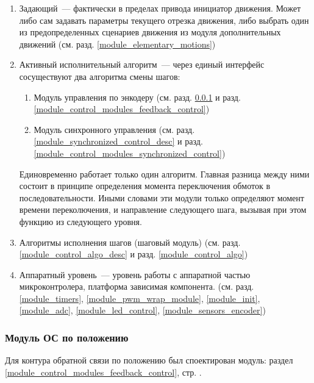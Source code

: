 \begin{enumerate}
    \item Задающий~--- фактически в пределах привода инициатор движения. Может
        либо сам задавать параметры текущего отрезка движения, либо выбрать один
        из предопределенных сценариев движения из модуля дополнительных
        движений (см. разд. \ref{module_elementary_motions})

    \item Активный исполнительный алгоритм~--- через единый интерфейс
        сосуществуют два алгоритма смены шагов:
        \begin{enumerate}
            \item Модуль управления по энкодеру (см. разд.
                \ref{module_feedback_control_desc} и разд.
                \ref{module_control_modules_feedback_control})
            \item Модуль синхронного управления (см. разд.
                \ref{module_synchronized_control_desc} и разд.
                \ref{module_control_modules_synchronized_control})
        \end{enumerate}
        Единовременно работает только один алгоритм. Главная разница между ними
        состоит в принципе определения момента переключения обмоток в
        последовательности. Иными словами эти модули только определяют момент
        времени переколючения, и направление следующего шага, вызывая при этом
        функцию из следующего уровня.
    \item Алгоритмы исполнения шагов (шаговый модуль) (см. разд.
        \ref{module_control_algo_desc} и разд.
        \ref{module_control_algo})
    \item Аппаратный уровень~--- уровень работы с аппаратной частью
        микроконтролера, платформа зависимая компонента. (см. разд.
            \ref{module_timers},
            \ref{module_pwm_wrap_module},
            \ref{module_init},
            \ref{module_adc},
            \ref{module_led_control},
            \ref{module_sensors_encoder})
\end{enumerate}

\subsubsection{Модуль ОС по положению}
\label{module_feedback_control_desc}
Для контура обратной связи по положению был споектирован модуль:
раздел \ref{module_control_modules_feedback_control},
стр. \pageref{module_control_modules_feedback_control}.

